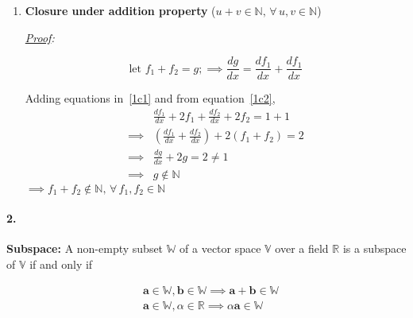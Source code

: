 \documentclass[12pt, letterpaper]{article}
\begin{document}
\begin{enumerate}

\item \textbf{Closure under addition property}
  ($u + v \in \mathbb{N}, \, \forall \, u, v \in \mathbb{N}$)

\textit{\underline{Proof}:}

  \begin{equation}
  \label{1c2}
    \text{let } f_1 + f_2 = g;
    \implies \frac{dg}{dx} = \frac{df_1}{dx} + \frac{df_1}{dx}
  \end{equation}

  Adding equations in~\ref{1c1} and from equation~\ref{1c2},
  \[
  \begin{split}
    &\frac{df_1}{dx} + 2f_1 + \frac{df_2}{dx} + 2f_2 = 1 + 1\\
    \implies &(\frac{df_1}{dx} + \frac{df_2}{dx}) + 2(f_1 + f_2) = 2\\
    \implies &\frac{dg}{dx} + 2g = 2 \neq 1\\
    \implies &g \not\in \mathbb{N}
  \end{split}
  \]
  $\implies\boxed{f_1 + f_2 \not\in\mathbb{N}, \, \forall\, f_1,f_2 \in\mathbb{N}}$

\end{enumerate}


\pagebreak
\paragraph{2.} \textbf{Subspace: }
A non-empty subset $\mathbb{W}$ of a vector space $\mathbb{V}$ over a field $\mathbb{R}$ is a subspace of $\mathbb{V}$ if and only if

\begin{equation}
  \label{2}
  \begin{split}
  &\mathbf{a} \in \mathbb{W}, \mathbf{b} \in \mathbb{W} \implies \mathbf{a} + \mathbf{b} \in \mathbb{W}\\
  &\mathbf{a}\in\mathbb{W}, \alpha \in \mathbb{R} \implies \alpha \mathbf{a}\in\mathbb{W}
  \end{split}
\end{equation}
\end{document}
